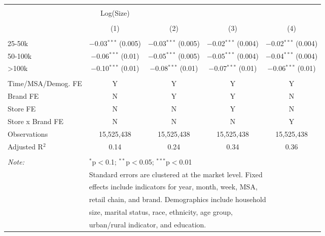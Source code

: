 
\begin{table}[!htbp] \centering 
  \caption{} 
  \label{tab:packageSizeFull3625} 
\begin{tabular}{@{\extracolsep{5pt}}lcccc} 
\\[-1.8ex]\hline 
\hline \\[-1.8ex] 
 & Log(Size) &  &  &  \\ 
\\[-1.8ex] & (1) & (2) & (3) & (4)\\ 
\hline \\[-1.8ex] 
 25-50k & $-$0.03$^{***}$ (0.005) & $-$0.03$^{***}$ (0.005) & $-$0.02$^{***}$ (0.004) & $-$0.02$^{***}$ (0.004) \\ 
  50-100k & $-$0.06$^{***}$ (0.01) & $-$0.05$^{***}$ (0.005) & $-$0.05$^{***}$ (0.004) & $-$0.04$^{***}$ (0.004) \\ 
  >100k & $-$0.10$^{***}$ (0.01) & $-$0.08$^{***}$ (0.01) & $-$0.07$^{***}$ (0.01) & $-$0.06$^{***}$ (0.01) \\ 
 \hline \\[-1.8ex] 
Time/MSA/Demog. FE & Y & Y & Y & Y \\ 
Brand FE & N & Y & Y & N \\ 
Store FE & N & N & Y & N \\ 
Store x Brand FE & N & N & N & Y \\ 
Observations & 15,525,438 & 15,525,438 & 15,525,438 & 15,525,438 \\ 
Adjusted R$^{2}$ & 0.14 & 0.24 & 0.34 & 0.36 \\ 
\hline 
\hline \\[-1.8ex] 
\textit{Note:}  & \multicolumn{4}{l}{$^{*}$p$<$0.1; $^{**}$p$<$0.05; $^{***}$p$<$0.01} \\ 
 & \multicolumn{4}{l}{Standard errors are clustered at the market level. Fixed } \\ 
 & \multicolumn{4}{l}{effects include indicators for year, month, week, MSA, } \\ 
 & \multicolumn{4}{l}{retail chain, and brand. Demographics include household } \\ 
 & \multicolumn{4}{l}{size, marital status, race, ethnicity, age group, } \\ 
 & \multicolumn{4}{l}{urban/rural indicator, and education.} \\ 
\end{tabular} 
\end{table} 
